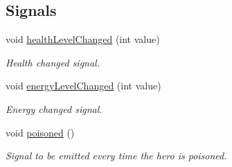 \subsection*{Signals}
\begin{DoxyCompactItemize}
\item 
void \hyperlink{classUProtagonist_a51cf4f46d0b8d841ac91fb26cd175f04}{health\+Level\+Changed} (int value)
\begin{DoxyCompactList}\small\item\em Health changed signal. \end{DoxyCompactList}\item 
void \hyperlink{classUProtagonist_a5f04fffdddf19813626e2676152425d9}{energy\+Level\+Changed} (int value)
\begin{DoxyCompactList}\small\item\em Energy changed signal. \end{DoxyCompactList}\item 
void \hyperlink{classUProtagonist_ade87a2c665976c4e46991e6aa9e41875}{poisoned} ()\hypertarget{classUProtagonist_ade87a2c665976c4e46991e6aa9e41875}{}\label{classUProtagonist_ade87a2c665976c4e46991e6aa9e41875}

\begin{DoxyCompactList}\small\item\em Signal to be emitted every time the hero is poisoned. \end{DoxyCompactList}\end{DoxyCompactItemize}

